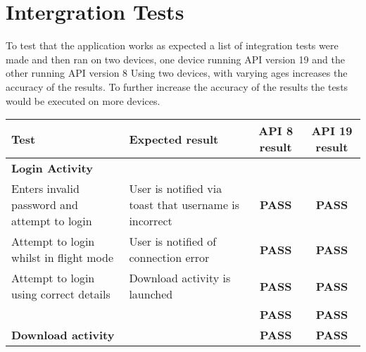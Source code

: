 \documentclass[11pt,fleqn,twoside]{article}
\begin{document}
\section{Intergration Tests}
 To test that the application works as expected a list of integration tests were made and then ran on two devices, one device running API version 19 and the other running API version 8 Using two devices, with varying ages increases the accuracy of the results. To further increase the accuracy of the results the tests would be executed on more devices. 
\begin{center}
\begin{longtable}{| p{5cm} | p{5cm} | c | c |}

\hline
\textbf{Test}                                                              & \textbf{Expected result}                                                                         & \textbf{API 8 result} & \textbf{API 19 result} \\ \hline
\textbf{Login Activity}                                                    & \textbf{}                                                                                        &                       &                        \\ \hline
Enters invalid password and attempt to login                               & User is notified via toast that username is incorrect                                            & \textbf{PASS}         & \textbf{PASS}          \\ \hline
Attempt to login whilst in flight mode                                     & User is notified of connection error                                                             & \textbf{PASS}         & \textbf{PASS}          \\ \hline
Attempt to login using correct details                                     & Download activity is launched                                                                    & \textbf{PASS}         & \textbf{PASS}          \\ \hline
                                                                           &                                                                                                  & \textbf{PASS}         & \textbf{PASS}          \\ \hline
\textbf{Download activity}                                                 &                                                                                                  & \textbf{PASS}         & \textbf{PASS}          \\ \hline

\end{longtable}
\end{center}
\end{document}
